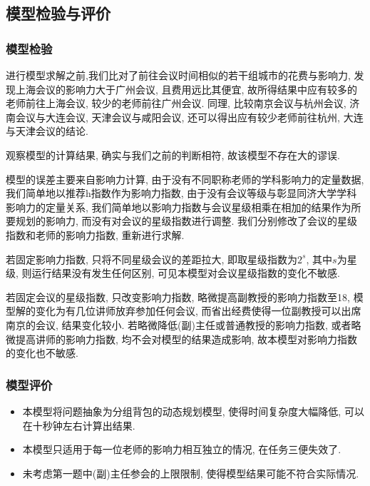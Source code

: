 \subsection{模型检验与评价}
    \subsubsection{模型检验}
        进行模型求解之前,我们比对了前往会议时间相似的若干组城市的花费与影响力,
        发现上海会议的影响力大于广州会议, 且费用远比其便宜,
        故所得结果中应有较多的老师前往上海会议, 较少的老师前往广州会议.
        同理, 比较南京会议与杭州会议, 济南会议与大连会议, 天津会议与咸阳会议, 
        还可以得出应有较少老师前往杭州, 大连与天津会议的结论.
        
        观察模型的计算结果, 确实与我们之前的判断相符, 故该模型不存在大的谬误.
        
            模型的误差主要来自影响力计算, 由于没有不同职称老师的学科影响力的定量数据,
            我们简单地以推荐h指数作为影响力指数, 由于没有会议等级与彰显同济大学学科影响力的定量关系,
            我们简单地以影响力指数与会议星级相乘在相加的结果作为所要规划的影响力,
            而没有对会议的星级指数进行调整.
            我们分别修改了会议的星级指数和老师的影响力指数, 重新进行求解.
            
            若固定影响力指数, 只将不同星级会议的差距拉大,
            即取星级指数为$2^s$, 其中$s$为星级,
            则运行结果没有发生任何区别,
            可见本模型对会议星级指数的变化不敏感.
            
            若固定会议的星级指数, 只改变影响力指数,
            略微提高副教授的影响力指数至18, 模型解的变化为有几位讲师放弃参加任何会议,
            而省出经费使得一位副教授可以出席南京的会议, 结果变化较小.
            若略微降低(副)主任或普通教授的影响力指数, 或者略微提高讲师的影响力指数,
            均不会对模型的结果造成影响, 故本模型对影响力指数的变化也不敏感.
    \subsubsection{模型评价}
            \begin{itemize}
                \item 本模型将问题抽象为分组背包的动态规划模型, 使得时间复杂度大幅降低,
                        可以在十秒钟左右计算出结果.
            \end{itemize}
            \begin{itemize}
                \item 本模型只适用于每一位老师的影响力相互独立的情况, 在任务三便失效了.
                \item 未考虑第一题中(副)主任参会的上限限制, 使得模型结果可能不符合实际情况.
            \end{itemize}